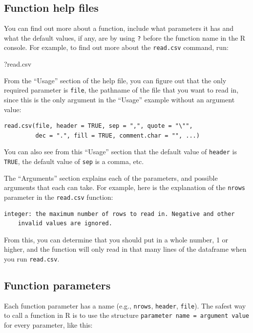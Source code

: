 \documentclass[]{book}
\makeatletter
\newenvironment{Shaded}{\begin{snugshade}}{\end{snugshade}}
\newcommand{\NormalTok}[1]{#1}
\newenvironment{kframe}{%
\medskip{}
\setlength{\fboxsep}{.8em}
 \def\at@end@of@kframe{}%
 \ifinner\ifhmode%
  \def\at@end@of@kframe{\end{minipage}}%
  \begin{minipage}{\columnwidth}%
 \fi\fi%
 \def\FrameCommand##1{\hskip\@totalleftmargin \hskip-\fboxsep
 \colorbox{shadecolor}{##1}\hskip-\fboxsep
     \hskip-\linewidth \hskip-\@totalleftmargin \hskip\columnwidth}%
 \MakeFramed {\advance\hsize-\width
   \@totalleftmargin\z@ \linewidth\hsize
   \@setminipage}}%
 {\par\unskip\endMakeFramed%
 \at@end@of@kframe}
\renewenvironment{Shaded}{\begin{kframe}}{\end{kframe}}
\theoremstyle{definition}
\theoremstyle{definition}
\theoremstyle{definition}
\theoremstyle{remark}
\makeatother
\begin{document}
\subsection{Function help files}\label{function-help-files}

You can find out more about a function, include what parameters it has
and what the default values, if any, are by using \texttt{?} before the
function name in the R console. For example, to find out more about the
\texttt{read.csv} command, run:

\begin{Shaded}
\begin{Highlighting}[]
\NormalTok{?read.csv}
\end{Highlighting}
\end{Shaded}

From the ``Usage'' section of the help file, you can figure out that the
only required parameter is \texttt{file}, the pathname of the file that
you want to read in, since this is the only argument in the ``Usage''
example without an argument value:

\begin{verbatim}
read.csv(file, header = TRUE, sep = ",", quote = "\"",
         dec = ".", fill = TRUE, comment.char = "", ...)
\end{verbatim}

You can also see from this ``Usage'' section that the default value of
\texttt{header} is \texttt{TRUE}, the default value of \texttt{sep} is a
comma, etc.

The ``Arguments'' section explains each of the parameters, and possible
arguments that each can take. For example, here is the explanation of
the \texttt{nrows} parameter in the \texttt{read.csv} function:

\begin{verbatim}
integer: the maximum number of rows to read in. Negative and other 
    invalid values are ignored.
\end{verbatim}

From this, you can determine that you should put in a whole number, 1 or
higher, and the function will only read in that many lines of the
dataframe when you run \texttt{read.csv}.

\subsection{Function parameters}\label{function-parameters}

Each function parameter has a name (e.g., \texttt{nrows},
\texttt{header}, \texttt{file}). The safest way to call a function in R
is to use the structure \texttt{parameter\ name\ =\ argument\ value} for
every parameter, like this:
\end{document}
